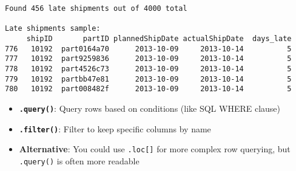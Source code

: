 \documentclass[
  letterpaper,
  DIV=11,
  numbers=noendperiod]{scrartcl}
\providecommand{\tightlist}{%
  \setlength{\itemsep}{0pt}\setlength{\parskip}{0pt}}
\begin{document}
\begin{verbatim}
Found 456 late shipments out of 4000 total

Late shipments sample:
     shipID       partID plannedShipDate actualShipDate  days_late
776   10192  part0164a70      2013-10-09     2013-10-14          5
777   10192  part9259836      2013-10-09     2013-10-14          5
778   10192  part4526c73      2013-10-09     2013-10-14          5
779   10192  partbb47e81      2013-10-09     2013-10-14          5
780   10192  part008482f      2013-10-09     2013-10-14          5
\end{verbatim}

\begin{tcolorbox}[enhanced jigsaw, colframe=quarto-callout-note-color-frame, title=\textcolor{quarto-callout-note-color}{\faInfo}\hspace{0.5em}{🔍 Understanding the Methods}, breakable, opacityback=0, arc=.35mm, leftrule=.75mm, titlerule=0mm, left=2mm, toptitle=1mm, rightrule=.15mm, bottomtitle=1mm, bottomrule=.15mm, opacitybacktitle=0.6, toprule=.15mm, colback=white, coltitle=black, colbacktitle=quarto-callout-note-color!10!white]

\begin{itemize}
\tightlist
\item
  \textbf{\texttt{.query()}}: Query rows based on conditions (like SQL
  WHERE clause)
\item
  \textbf{\texttt{.filter()}}: Filter to keep specific columns by name
\item
  \textbf{Alternative}: You could use \texttt{.loc{[}{]}} for more
  complex row querying, but \texttt{.query()} is often more readable
\end{itemize}

\end{tcolorbox}
\end{document}
